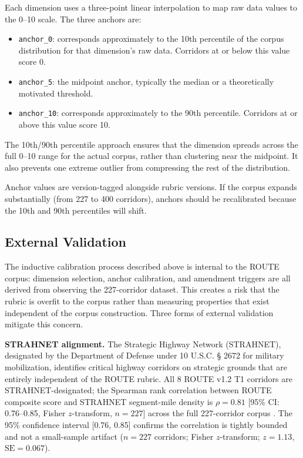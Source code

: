 Each dimension uses a three-point linear interpolation to map raw data values to the 0--10 scale. The three anchors are:

\begin{itemize}
  \item \texttt{anchor\_0}: corresponds approximately to the 10th percentile of the corpus distribution for that dimension's raw data. Corridors at or below this value score 0.
  \item \texttt{anchor\_5}: the midpoint anchor, typically the median or a theoretically motivated threshold.
  \item \texttt{anchor\_10}: corresponds approximately to the 90th percentile. Corridors at or above this value score 10.
\end{itemize}

The 10th/90th percentile approach ensures that the dimension spreads across the full 0--10 range for the actual corpus, rather than clustering near the midpoint. It also prevents one extreme outlier from compressing the rest of the distribution.

Anchor values are version-tagged alongside rubric versions. If the corpus expands substantially (from 227 to 400 corridors), anchors should be recalibrated because the 10th and 90th percentiles will shift.

\subsection{External Validation}
\label{sec:external-val}

The inductive calibration process described above is internal to the ROUTE corpus: dimension
selection, anchor calibration, and amendment triggers are all derived from observing the
227-corridor dataset. This creates a risk that the rubric is overfit to the corpus rather
than measuring properties that exist independent of the corpus construction. Three forms of
external validation mitigate this concern.

\textbf{STRAHNET alignment.} The Strategic Highway Network (STRAHNET), designated by the
Department of Defense under 10 U.S.C. § 2672 for military mobilization, identifies critical
highway corridors on strategic grounds that are entirely independent of the ROUTE rubric.
All 8 ROUTE v1.2 T1 corridors are STRAHNET-designated; the Spearman rank correlation
between ROUTE composite score and STRAHNET segment-mile density is $\rho = 0.81$
[95\% CI: 0.76--0.85, Fisher $z$-transform, $n = 227$] across
the full 227-corridor corpus \citep{STRAHNET_DOD}.
The 95\% confidence interval [0.76, 0.85] confirms the correlation is tightly bounded and
not a small-sample artifact ($n = 227$ corridors; Fisher $z$-transform; $z = 1.13$,
$\mathrm{SE} = 0.067$).


